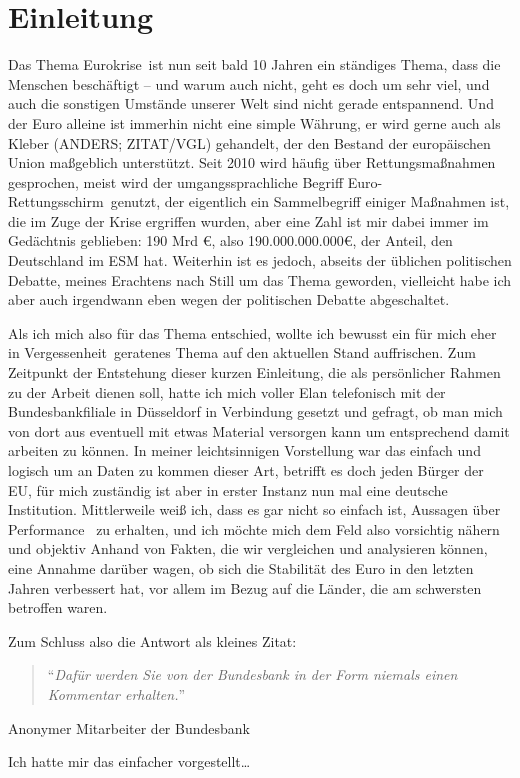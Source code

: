 \section*{Einleitung}
Das Thema \glqq Eurokrise\grqq \ ist nun seit bald 10 Jahren ein ständiges Thema, dass die Menschen beschäftigt -- und warum auch nicht, geht es doch um sehr viel, und auch die sonstigen Umstände unserer Welt sind nicht gerade entspannend. Und der Euro alleine ist immerhin nicht eine simple Währung, er wird gerne auch als Kleber (ANDERS; ZITAT/VGL) gehandelt, der den Bestand der europäischen Union maßgeblich unterstützt. Seit 2010 wird häufig über Rettungsmaßnahmen gesprochen, meist wird der
umgangssprachliche Begriff \glqq Euro-Rettungsschirm\grqq\ genutzt, der eigentlich ein Sammelbegriff einiger Maßnahmen ist, die im Zuge der Krise ergriffen wurden, aber eine Zahl ist mir dabei immer im Gedächtnis geblieben: 190 Mrd \euro{}, also 190.000.000.000\euro{}, der Anteil, den Deutschland im \gls{ESM} hat.
Weiterhin ist es jedoch, abseits der üblichen politischen Debatte, meines Erachtens nach Still um das Thema geworden, vielleicht habe ich aber auch irgendwann eben wegen der politischen Debatte abgeschaltet.

Als ich mich also für das Thema entschied, wollte ich bewusst ein für mich eher in \glqq Vergessenheit\grqq \ geratenes Thema auf den aktuellen Stand auffrischen.
Zum Zeitpunkt der Entstehung dieser kurzen Einleitung, die als persönlicher Rahmen zu der Arbeit dienen soll, hatte ich mich voller Elan telefonisch mit der Bundesbankfiliale in Düsseldorf in Verbindung gesetzt und gefragt, ob man mich von dort aus eventuell mit etwas Material versorgen kann um entsprechend damit arbeiten zu können. In meiner leichtsinnigen Vorstellung war das einfach und logisch um an Daten zu kommen dieser Art, betrifft es doch jeden Bürger der EU, für mich zuständig ist aber
in erster Instanz nun mal eine deutsche Institution. Mittlerweile weiß ich, dass es gar nicht so einfach ist, Aussagen über \glqq Performance \grqq \ zu erhalten, und ich möchte mich dem Feld also vorsichtig nähern und objektiv Anhand von Fakten, die wir vergleichen und analysieren können, eine Annahme darüber wagen, ob sich die Stabilität des \gls{Euro} in den letzten Jahren verbessert hat, vor allem im Bezug auf die Länder, die am schwersten betroffen waren.

Zum Schluss also die Antwort als kleines Zitat:
\begin{quote}
  \enquote{\textit{Dafür werden Sie von der Bundesbank in der Form niemals einen Kommentar erhalten.}}
\end{quote}
\hfill Anonymer Mitarbeiter der Bundesbank

Ich hatte mir das einfacher vorgestellt\dots
